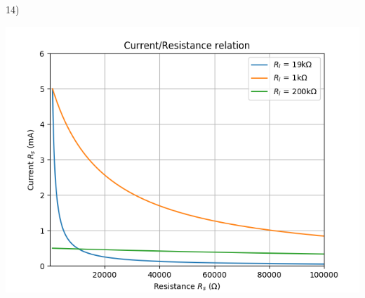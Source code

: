 \documentclass{../../myassignment}
\begin{document}
	14)
	
	\begin{answer}
		\includegraphics[scale=0.8]{bigvariableresistor.png}
	\end{answer}
\end{document}
